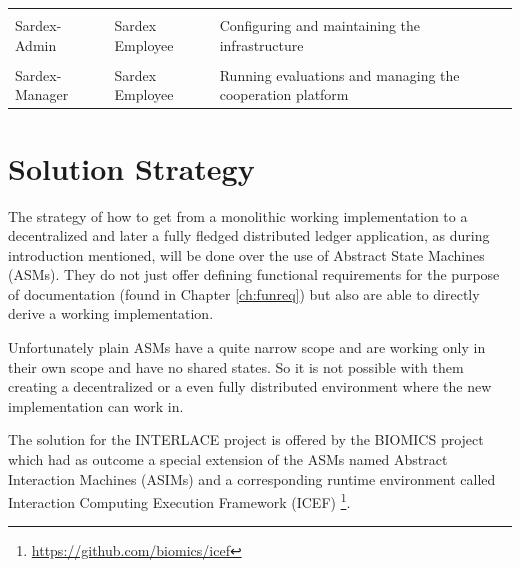 \begin{longtable}[]{@{}lll@{}}
\tabularnewline
\tabularnewline
\begin{minipage}[t]{0.18\columnwidth}Sardex-Admin \end{minipage} &
\begin{minipage}[t]{0.37\columnwidth}Sardex Employee \end{minipage} &
\begin{minipage}[t]{0.37\columnwidth}Configuring and maintaining the infrastructure\end{minipage}
\tabularnewline
\tabularnewline
\begin{minipage}[t]{0.18\columnwidth}Sardex-Manager \end{minipage} &
\begin{minipage}[t]{0.37\columnwidth}Sardex Employee \end{minipage} &
\begin{minipage}[t]{0.37\columnwidth}Running evaluations and managing the cooperation platform \end{minipage}
\tabularnewline


\bottomrule
\end{longtable}

\section{Solution Strategy}\label{section-solution-strategy}

The strategy of how to get from a monolithic working implementation to a decentralized and later a fully fledged distributed ledger application, as during introduction mentioned, will be done over the use of Abstract State Machines (ASMs). They do not just offer defining functional requirements for the purpose of documentation (found in Chapter \ref{ch:funreq}) but also are able to directly derive a working implementation.

Unfortunately plain ASMs have a quite narrow scope and are working only in their own scope and have no shared states. So it is not possible with them creating a decentralized or a even fully distributed environment where the new implementation can work in.

The solution for the INTERLACE project is offered by the BIOMICS project which had as outcome a special extension of the ASMs named Abstract Interaction Machines (ASIMs) and a corresponding runtime environment called Interaction Computing Execution Framework (ICEF) \footnote{\url{https://github.com/biomics/icef}}.

